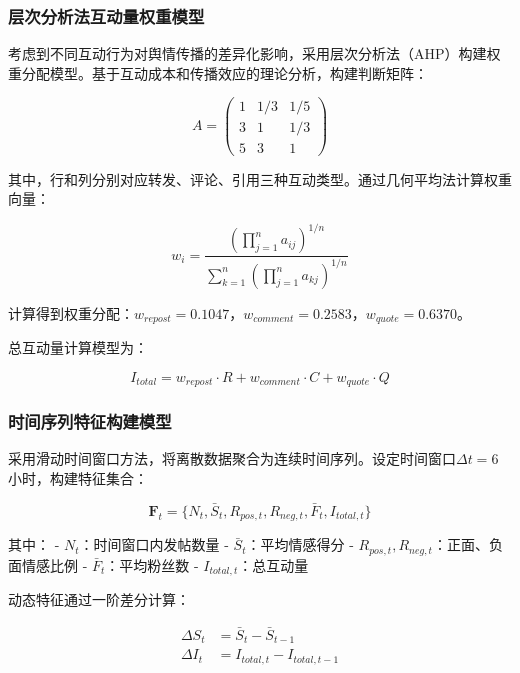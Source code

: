 \documentclass[withoutpreface,bwprint]{cumcmthesis}
\begin{document}
\subsubsection{层次分析法互动量权重模型}

考虑到不同互动行为对舆情传播的差异化影响，采用层次分析法（AHP）构建权重分配模型。基于互动成本和传播效应的理论分析，构建判断矩阵：

\begin{equation}
\label{eq:ahp_matrix}
A = \begin{pmatrix}
1 & 1/3 & 1/5 \\
3 & 1 & 1/3 \\
5 & 3 & 1
\end{pmatrix}
\end{equation}

其中，行和列分别对应转发、评论、引用三种互动类型。通过几何平均法计算权重向量：

\begin{equation}
\label{eq:weight_calculation}
w_i = \frac{(\prod_{j=1}^{n} a_{ij})^{1/n}}{\sum_{k=1}^{n}(\prod_{j=1}^{n} a_{kj})^{1/n}}
\end{equation}

计算得到权重分配：$w_{repost} = 0.1047$，$w_{comment} = 0.2583$，$w_{quote} = 0.6370$。

总互动量计算模型为：

\begin{equation}
\label{eq:total_interaction}
I_{total} = w_{repost} \cdot R + w_{comment} \cdot C + w_{quote} \cdot Q
\end{equation}

\subsubsection{时间序列特征构建模型}

采用滑动时间窗口方法，将离散数据聚合为连续时间序列。设定时间窗口$\Delta t = 6$小时，构建特征集合：

\begin{equation}
\label{eq:time_features}
\mathbf{F}_t = \{N_t, \bar{S}_t, R_{pos,t}, R_{neg,t}, \bar{F}_t, I_{total,t}\}
\end{equation}

其中：
- $N_t$：时间窗口内发帖数量
- $\bar{S}_t$：平均情感得分
- $R_{pos,t}, R_{neg,t}$：正面、负面情感比例
- $\bar{F}_t$：平均粉丝数
- $I_{total,t}$：总互动量

动态特征通过一阶差分计算：

\begin{equation}
\label{eq:dynamic_features}
\begin{aligned}
\Delta S_t &= \bar{S}_t - \bar{S}_{t-1} \\
\Delta I_t &= I_{total,t} - I_{total,t-1}
\end{aligned}
\end{equation}
\end{document}
